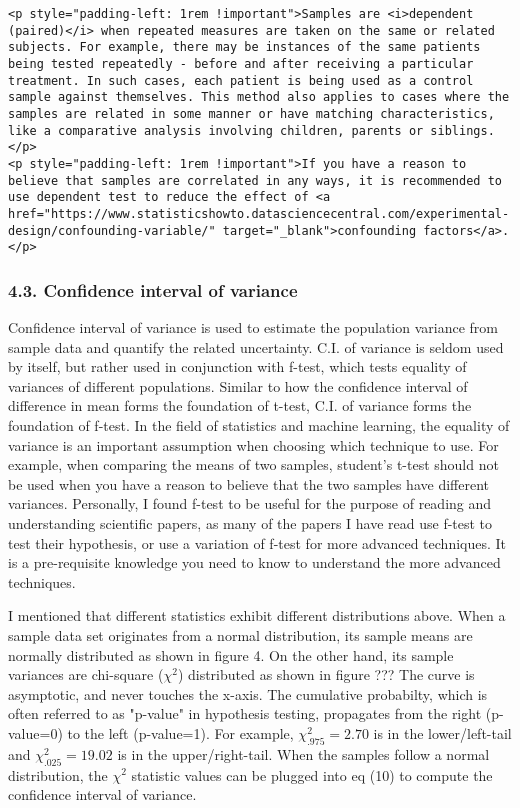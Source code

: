 \documentclass[11pt]{article}
\begin{document}
\begin{verbatim}
<p style="padding-left: 1rem !important">Samples are <i>dependent (paired)</i> when repeated measures are taken on the same or related subjects. For example, there may be instances of the same patients being tested repeatedly - before and after receiving a particular treatment. In such cases, each patient is being used as a control sample against themselves. This method also applies to cases where the samples are related in some manner or have matching characteristics, like a comparative analysis involving children, parents or siblings.</p>
<p style="padding-left: 1rem !important">If you have a reason to believe that samples are correlated in any ways, it is recommended to use dependent test to reduce the effect of <a href="https://www.statisticshowto.datasciencecentral.com/experimental-design/confounding-variable/" target="_blank">confounding factors</a>.</p>
\end{verbatim}

    \hypertarget{conf_int_of_var}{}

\subsubsection{4.3. Confidence interval of
variance}\label{confidence-interval-of-variance}

Confidence interval of variance is used to estimate the population
variance from sample data and quantify the related uncertainty. C.I. of
variance is seldom used by itself, but rather used in conjunction with
f-test, which tests equality of variances of different populations.
Similar to how the confidence interval of difference in mean forms the
foundation of t-test, C.I. of variance forms the foundation of f-test.
In the field of statistics and machine learning, the equality of
variance is an important assumption when choosing which technique to
use. For example, when comparing the means of two samples, student's
t-test should not be used when you have a reason to believe that the two
samples have different variances. Personally, I found f-test to be
useful for the purpose of reading and understanding scientific papers,
as many of the papers I have read use f-test to test their hypothesis,
or use a variation of f-test for more advanced techniques. It is a
pre-requisite knowledge you need to know to understand the more advanced
techniques.

I mentioned that different statistics exhibit different distributions
above. When a sample data set originates from a normal distribution, its
sample means are normally distributed as shown in figure 4. On the other
hand, its sample variances are chi-square ({\(\chi^2\)}) distributed as
shown in figure ??? The curve is asymptotic, and never touches the
x-axis. The cumulative probabilty, which is often referred to as
"p-value" in hypothesis testing, propagates from the right (p-value=0)
to the left (p-value=1). For example, {\(\chi^2_{.975}=2.70\)} is in the
lower/left-tail and {\(\chi^2_{.025} = 19.02\)} is in the
upper/right-tail. When the samples follow a normal distribution, the
{\(\chi^2\)} statistic values can be plugged into eq (10) to compute the
confidence interval of variance.
\end{document}
